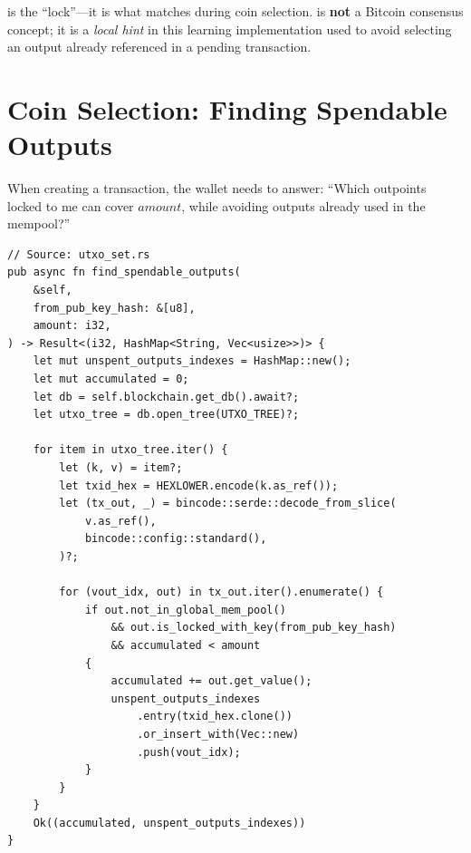 \begin{notebox}
 is the ``lock''---it is what  matches during coin selection.  is \textbf{not} a Bitcoin consensus concept; it is a \emph{local hint} in this learning implementation used to avoid selecting an output already referenced in a pending transaction.
\end{notebox}

\section{Coin Selection: Finding Spendable Outputs}
\label{sec:ch09-4-coin-selection}

When creating a transaction, the wallet needs to answer: ``Which outpoints locked to me can cover \(\mathit{amount}\), while avoiding outputs already used in the mempool?''

\begin{listing}[htbp]
\caption{ --- scan and select}
\label{lst:ch09-4-4}
\begin{verbatim}
// Source: utxo_set.rs
pub async fn find_spendable_outputs(
    &self,
    from_pub_key_hash: &[u8],
    amount: i32,
) -> Result<(i32, HashMap<String, Vec<usize>>)> {
    let mut unspent_outputs_indexes = HashMap::new();
    let mut accumulated = 0;
    let db = self.blockchain.get_db().await?;
    let utxo_tree = db.open_tree(UTXO_TREE)?;

    for item in utxo_tree.iter() {
        let (k, v) = item?;
        let txid_hex = HEXLOWER.encode(k.as_ref());
        let (tx_out, _) = bincode::serde::decode_from_slice(
            v.as_ref(),
            bincode::config::standard(),
        )?;

        for (vout_idx, out) in tx_out.iter().enumerate() {
            if out.not_in_global_mem_pool()
                && out.is_locked_with_key(from_pub_key_hash)
                && accumulated < amount
            {
                accumulated += out.get_value();
                unspent_outputs_indexes
                    .entry(txid_hex.clone())
                    .or_insert_with(Vec::new)
                    .push(vout_idx);
            }
        }
    }
    Ok((accumulated, unspent_outputs_indexes))
}
\end{verbatim}
\end{listing}

